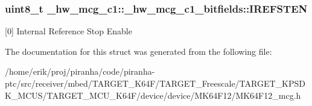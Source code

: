 \subsubsection[{\texorpdfstring{I\+R\+E\+F\+S\+T\+EN}{IREFSTEN}}]{\setlength{\rightskip}{0pt plus 5cm}uint8\+\_\+t \+\_\+hw\+\_\+mcg\+\_\+c1\+::\+\_\+hw\+\_\+mcg\+\_\+c1\+\_\+bitfields\+::\+I\+R\+E\+F\+S\+T\+EN}\hypertarget{struct__hw__mcg__c1_1_1__hw__mcg__c1__bitfields_ac52aec473d5ce4658b1065a251a141a9}{}\label{struct__hw__mcg__c1_1_1__hw__mcg__c1__bitfields_ac52aec473d5ce4658b1065a251a141a9}
\mbox{[}0\mbox{]} Internal Reference Stop Enable 

The documentation for this struct was generated from the following file\+:\begin{DoxyCompactItemize}
\item 
/home/erik/proj/piranha/code/piranha-\/ptc/src/receiver/mbed/\+T\+A\+R\+G\+E\+T\+\_\+\+K64\+F/\+T\+A\+R\+G\+E\+T\+\_\+\+Freescale/\+T\+A\+R\+G\+E\+T\+\_\+\+K\+P\+S\+D\+K\+\_\+\+M\+C\+U\+S/\+T\+A\+R\+G\+E\+T\+\_\+\+M\+C\+U\+\_\+\+K64\+F/device/device/\+M\+K64\+F12/M\+K64\+F12\+\_\+mcg.\+h\end{DoxyCompactItemize}
